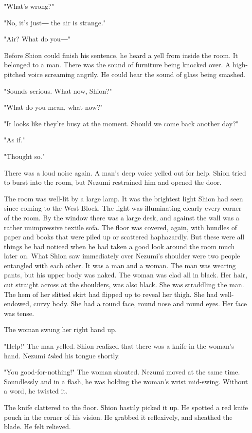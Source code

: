 "What's wrong?"

"No, it's just― the air is strange."

"Air? What do you―"

Before Shion could finish his sentence, he heard a yell from inside the
room. It belonged to a man. There was the sound of furniture being
knocked over. A high-pitched voice screaming angrily. He could hear the
sound of glass being smashed.

"Sounds serious. What now, Shion?"

"What do you mean, what now?"

"It looks like they're busy at the moment. Should we come back another
day?"

"As if."

"Thought so."

There was a loud noise again. A man's deep voice yelled out for help.
Shion tried to burst into the room, but Nezumi restrained him and opened
the door.

The room was well-lit by a large lamp. It was the brightest light Shion
had seen since coming to the West Block. The light was illuminating
clearly every corner of the room. By the window there was a large desk,
and against the wall was a rather unimpressive textile sofa. The floor
was covered, again, with bundles of paper and books that were piled up
or scattered haphazardly. But these were all things he had noticed when
he had taken a good look around the room much later on. What Shion saw
immediately over Nezumi's shoulder were two people entangled with each
other. It was a man and a woman. The man was wearing pants, but his
upper body was naked. The woman was clad all in black. Her hair, cut
straight across at the shoulders, was also black. She was straddling the
man. The hem of her slitted skirt had flipped up to reveal her thigh.
She had well-endowed, curvy body. She had a round face, round nose and
round eyes. Her face was tense.

The woman swung her right hand up.

"Help!" The man yelled. Shion realized that there was a knife in the
woman's hand. Nezumi \emph{tsk}ed his tongue shortly.

"You good-for-nothing!" The woman shouted. Nezumi moved at the same
time. Soundlessly and in a flash, he was holding the woman's wrist
mid-swing. Without a word, he twisted it.

The knife clattered to the floor. Shion hastily picked it up. He spotted
a red knife pouch in the corner of his vision. He grabbed it
reflexively, and sheathed the blade. He felt relieved.

